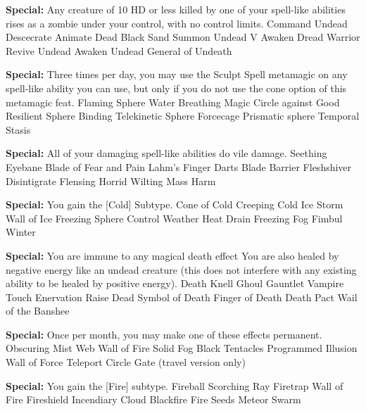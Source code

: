 \begin{multicols}{2}

\textbf{Special: }{Any creature of 10 HD or less killed by one of your spell-like abilities rises as a zombie under your control, with no control limits.}
\sphere
{Command Undead}
{Descecrate}
{Animate Dead}
{Black Sand}
{Summon Undead V}
{Awaken Dread Warrior}
{Revive Undead}
{Awaken Undead}
{General of Undeath}

\textbf{Special: }{Three times per day, you may use the Sculpt Spell metamagic on any spell-like ability you can use, but only if you do not use the cone option of this metamagic feat.}
\sphere
{Flaming Sphere}
{Water Breathing}
{Magic Circle against Good}
{Resilient Sphere}
{Binding}
{Telekinetic Sphere}
{Forcecage}
{Prismatic sphere}
{Temporal Stasis}

\textbf{Special: }{All of your damaging spell-like abilities do vile damage.}
\sphere
{Seething Eyebane}
{Blade of Fear and Pain}
{Lahm's Finger Darts}
{Blade Barrier}
{Fleshshiver}
{Disintigrate}
{Flensing}
{Horrid Wilting}
{Mass Harm}

\textbf{Special: }{You gain the [Cold] Subtype.}
\sphere
{Cone of Cold}
{Creeping Cold}
{Ice Storm}
{Wall of Ice}
{Freezing Sphere}
{Control Weather}
{Heat Drain}
{Freezing Fog}
{Fimbul Winter}

\textbf{Special: }{You are immune to any magical death effect You are also healed by negative energy like an undead creature (this does not interfere with any existing ability to be healed by positive energy).}
\sphere
{Death Knell}
{Ghoul Gauntlet}
{Vampire Touch}
{Enervation}
{Raise Dead}
{Symbol of Death}
{Finger of Death}
{Death Pact}
{Wail of the Banshee}

\textbf{Special: }{Once per month, you may make one of these effects permanent.}
\sphere
{Obscuring Mist}
{Web}
{Wall of Fire}
{Solid Fog}
{Black Tentacles}
{Programmed Illusion}
{Wall of Force}
{Teleport Circle}
{Gate (travel version only)}

\textbf{Special: }{You gain the [Fire] subtype.}
\sphere
{Fireball}
{Scorching Ray}
{Firetrap}
{Wall of Fire}
{Fireshield}
{Incendiary Cloud}
{Blackfire}
{Fire Seeds}
{Meteor Swarm}


\end{multicols}
